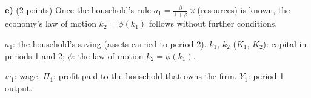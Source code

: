 \textbf{e)} (2 points) Once the household's rule $a_1=\frac{\beta}{1+\beta}\times$(resources) is known, the economy's law of motion $k_2=\phi(k_1)$
follows without further conditions.
\begin{sol}
\begin{notacao}
\item $a_1$: the household's saving (assets carried to period 2). $k_1$, $k_2$ ($K_1$, $K_2$): capital in periods 1 and 2;
$\phi$: the law of motion $k_2=\phi(k_1)$.
\item $w_1$: wage. $\Pi_1$: profit paid to the household that owns the firm. $Y_1$: period-1 output.
\end{notacao}
\end{sol}
\begin{sol}
\end{sol}
